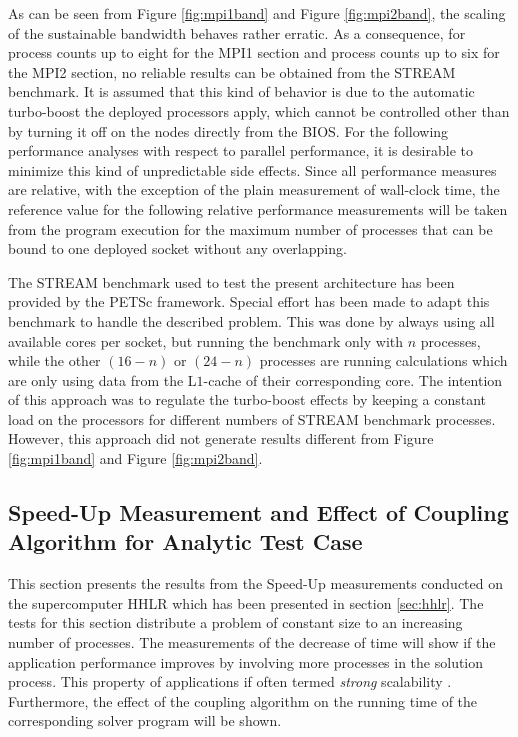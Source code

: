 As can be seen from Figure \ref{fig:mpi1band} and Figure \ref{fig:mpi2band}, the scaling of the sustainable bandwidth behaves rather erratic. As a consequence, for process counts up to eight for the MPI1 section and process counts up to six for the MPI2 section, no reliable results can be obtained from the STREAM benchmark. It is assumed that this kind of behavior is due to the automatic turbo-boost the deployed processors apply, which cannot be controlled other than by turning it off on the nodes directly from the BIOS. For the following performance analyses with respect to parallel performance, it is desirable to minimize this kind of unpredictable side effects. Since all performance measures are relative, with the exception of the plain measurement of wall-clock time, the reference value for the following relative performance measurements will be taken from the program execution for the maximum number of processes that can be bound to one deployed socket without any overlapping.

The STREAM benchmark used to test the present architecture has been provided by the PETSc framework. Special effort has been made to adapt this benchmark to handle the described problem. This was done by always using all available cores per socket, but running the benchmark only with \(n\) processes, while the other \(\left(16 - n\right)\) or \(\left(24 - n\right)\) processes are running calculations which are only using data from the L\(1\)-cache of their corresponding core. The intention of this approach was to regulate the turbo-boost effects by keeping a constant load on the processors for different numbers of STREAM benchmark processes. However, this approach did not generate results different from Figure \ref{fig:mpi1band} and Figure \ref{fig:mpi2band}.

\subsection{Speed-Up Measurement and Effect of Coupling Algorithm for Analytic Test Case}
\label{sec:speedup}

This section presents the results from the Speed-Up measurements conducted on the supercomputer HHLR which has been presented in section \ref{sec:hhlr}. The tests for this section distribute a problem of constant size to an increasing number of processes. The measurements of the decrease of time will show if the application performance improves by involving more processes in the solution process. This property of applications if often termed \emph{strong} scalability \cite{hager11}. Furthermore, the effect of the coupling algorithm on the running time of the corresponding solver program will be shown. 

